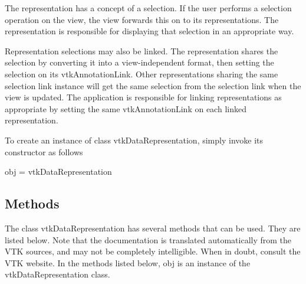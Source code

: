 The representation has a concept of a selection. If the user performs a selection operation on the view, the view forwards this on to its representations. The representation is responsible for displaying that selection in an appropriate way.

Representation selections may also be linked. The representation shares the selection by converting it into a view-\/independent format, then setting the selection on its vtk\-Annotation\-Link. Other representations sharing the same selection link instance will get the same selection from the selection link when the view is updated. The application is responsible for linking representations as appropriate by setting the same vtk\-Annotation\-Link on each linked representation.

To create an instance of class vtk\-Data\-Representation, simply invoke its constructor as follows \begin{DoxyVerb}  obj = vtkDataRepresentation
\end{DoxyVerb}
 \hypertarget{vtkwidgets_vtkxyplotwidget_Methods}{}\subsection{Methods}\label{vtkwidgets_vtkxyplotwidget_Methods}
The class vtk\-Data\-Representation has several methods that can be used. They are listed below. Note that the documentation is translated automatically from the V\-T\-K sources, and may not be completely intelligible. When in doubt, consult the V\-T\-K website. In the methods listed below, {\ttfamily obj} is an instance of the vtk\-Data\-Representation class. 
